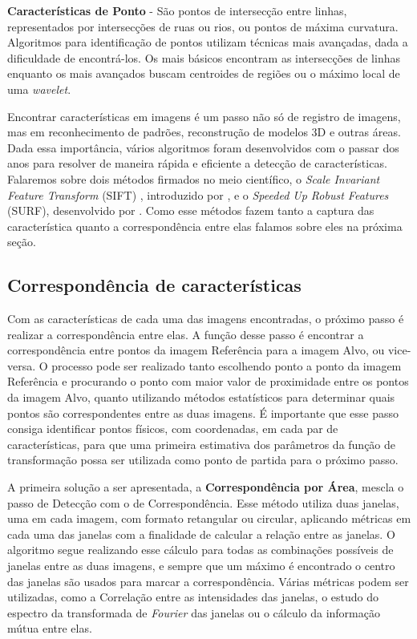 \textbf{Características de Ponto} - São pontos de intersecção entre linhas, representados por intersecções de ruas ou
rios, ou pontos de máxima curvatura. Algoritmos para identificação de pontos utilizam técnicas mais avançadas, dada a 
dificuldade de encontrá-los. Os mais básicos encontram as intersecções de linhas enquanto os mais avançados buscam
centroides de regiões ou o máximo local de uma \textit{wavelet}.

  Encontrar características em imagens é um passo não só de registro de imagens, mas em reconhecimento de padrões, 
reconstrução de modelos 3D e outras áreas. Dada essa importância, vários algoritmos foram desenvolvidos com o passar dos
anos para resolver de maneira rápida e eficiente a detecção de características. Falaremos sobre dois métodos firmados 
no meio científico, o \textit{Scale Invariant Feature Transform} (SIFT) , introduzido por \cite{lowe2004distinctive}, e 
o \textit{Speeded Up Robust Features} (SURF), desenvolvido por \cite{bay2008speeded}. Como esse métodos fazem tanto a 
captura das característica quanto a correspondência entre elas falamos sobre eles na próxima seção.

\subsection{Correspondência de características}

    Com as características de cada uma das imagens encontradas, o próximo passo é realizar a correspondência entre elas.
A função desse passo é encontrar a correspondência entre pontos da imagem Referência para a imagem Alvo, ou vice-versa. 
O processo pode ser realizado tanto escolhendo ponto a ponto da imagem Referência e procurando o ponto com maior valor 
de proximidade entre os pontos da imagem Alvo, quanto utilizando métodos estatísticos para determinar quais pontos são 
correspondentes entre as duas imagens. É importante que esse passo consiga identificar pontos físicos, com coordenadas, 
em cada par de características, para que uma primeira estimativa dos parâmetros da função de transformação possa ser 
utilizada como ponto de partida para o próximo passo.

    A primeira solução a ser apresentada, a \textbf{Correspondência por Área}, mescla o passo de Detecção com o de 
Correspondência. Esse método utiliza duas janelas, uma em cada imagem, com formato retangular ou circular, aplicando
métricas em cada uma das janelas com a finalidade de calcular a relação entre as janelas. O algoritmo segue realizando
esse cálculo para todas as combinações possíveis de janelas entre as duas imagens, e sempre que um máximo é encontrado
o centro das janelas são usados para marcar a correspondência. Várias métricas podem ser utilizadas, como a 
Correlação entre as intensidades das janelas, o estudo do espectro da transformada de \textit{Fourier} das janelas ou 
o cálculo da informação mútua entre elas.

